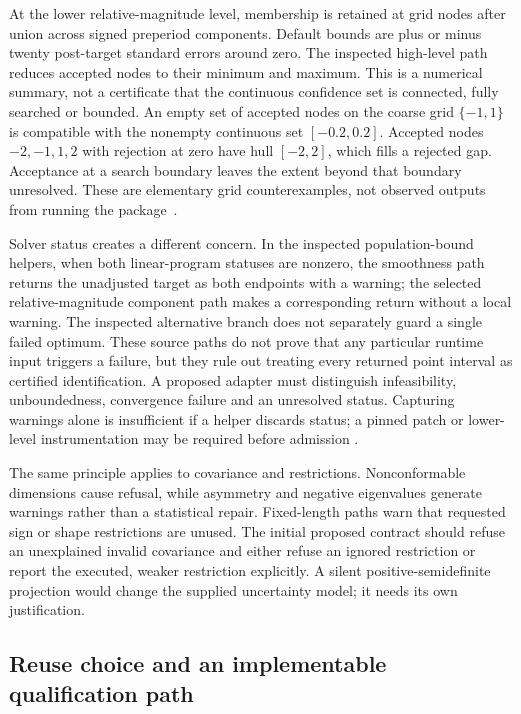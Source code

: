 At the lower relative-magnitude level, membership is retained at grid nodes
after union across signed preperiod components. Default bounds are plus or
minus twenty post-target standard errors around zero. The inspected high-level
path reduces accepted nodes to their minimum and maximum. This is a numerical
summary, not a certificate that the continuous confidence set is connected,
fully searched or bounded. An empty set of accepted nodes on the coarse grid
$\{-1,1\}$ is compatible with the nonempty continuous set $[-0.2,0.2]$.
Accepted nodes $-2,-1,1,2$ with rejection at zero have hull $[-2,2]$, which
fills a rejected gap. Acceptance at a search boundary leaves the extent beyond
that boundary unresolved. These are elementary grid counterexamples, not
observed outputs from running the package~\citep{exec22_honestdid_engine,exec22_honestdid_reference}.

Solver status creates a different concern. In the inspected population-bound
helpers, when both linear-program statuses are nonzero, the smoothness path
returns the unadjusted target as both endpoints with a warning; the selected
relative-magnitude component path makes a corresponding return without a local
warning. The inspected alternative branch does not separately guard a single
failed optimum. These source paths do not prove that any particular runtime
input triggers a failure, but they rule out treating every returned point
interval as certified identification. A proposed adapter must distinguish
infeasibility, unboundedness, convergence failure and an unresolved status.
Capturing warnings alone is insufficient if a helper discards status; a pinned
patch or lower-level instrumentation may be required before admission
\citep{exec22_honestdid_engine}.

The same principle applies to covariance and restrictions. Nonconformable
dimensions cause refusal, while asymmetry and negative eigenvalues generate
warnings rather than a statistical repair. Fixed-length paths warn that
requested sign or shape restrictions are unused. The initial proposed contract
should refuse an unexplained invalid covariance and either refuse an ignored
restriction or report the executed, weaker restriction explicitly. A silent
positive-semidefinite projection would change the supplied uncertainty model;
it needs its own justification.

\subsection{Reuse choice and an implementable qualification path}
\label{exec22:hd-reuse}

